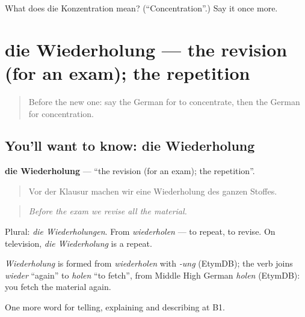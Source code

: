\begin{tcolorbox}[breakable,colback=teal!4,colframe=teal!35!black,title={Before you move on}]
What does die Konzentration mean? (\textquotedblleft{}Concentration\textquotedblright{}.) Say it once more.
\end{tcolorbox}
\section[die Wiederholung]{die Wiederholung — the revision (for an exam); the repetition}

\label{lesson:GE-C376-wiederholung}



\begin{quote}
Before the new one: say the German for to concentrate, then the German for concentration.
\end{quote}

\subsection*{You'll want to know: die Wiederholung}
\textbf{die Wiederholung} — \textquotedblleft{}the revision (for an exam); the repetition\textquotedblright{}.

\begin{quote}
Vor der Klausur machen wir eine Wiederholung des ganzen Stoffes.
\end{quote}

\begin{quote}
\emph{Before the exam we revise all the material.}
\end{quote}

Plural: \emph{die Wiederholungen}. From \emph{wiederholen} — to repeat, to revise. On television, \emph{die Wiederholung} is a repeat.

\begin{cousinweb}
\emph{Wiederholung} is formed from \emph{wiederholen} with \emph{-ung} (EtymDB); the verb joins \emph{wieder} \textquotedblleft{}again\textquotedblright{} to \emph{holen} \textquotedblleft{}to fetch\textquotedblright{}, from Middle High German \emph{holen} (EtymDB): you fetch the material again.
\end{cousinweb}

\begin{grammarlens}[title={What you've built}]
One more word for telling, explaining and describing at B1.
\end{grammarlens}

